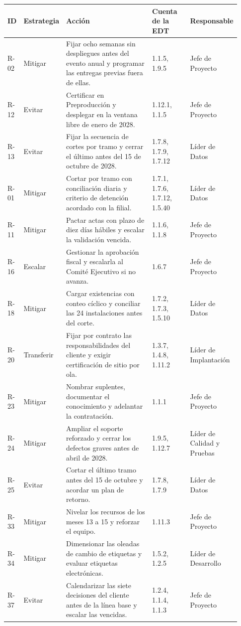 \documentclass[11pt]{article}
\begin{document}
\begin{longtable}{p{0.069\linewidth}p{0.109\linewidth}p{0.406\linewidth}p{0.178\linewidth}p{0.168\linewidth}}
\toprule
\textbf{ID} & \textbf{Estrategia} & \textbf{Acción} & \textbf{Cuenta de la EDT} & \textbf{Responsable} \\
\midrule
\endhead
\bottomrule
\endlastfoot
R-02 & Mitigar & Fijar ocho semanas sin despliegues antes del evento anual y programar las entregas previas fuera de ellas. & 1.1.5, 1.9.5 & Jefe de Proyecto \\
R-12 & Evitar & Certificar en Preproducción y desplegar en la ventana libre de enero de 2028. & 1.12.1, 1.1.5 & Jefe de Proyecto \\
R-13 & Evitar & Fijar la secuencia de cortes por tramo y cerrar el último antes del 15 de octubre de 2028. & 1.7.8, 1.7.9, 1.7.12 & Líder de Datos \\
R-01 & Mitigar & Cortar por tramo con conciliación diaria y criterio de detención acordado con la filial. & 1.7.1, 1.7.6, 1.7.12, 1.5.40 & Líder de Datos \\
R-11 & Mitigar & Pactar actas con plazo de diez días hábiles y escalar la validación vencida. & 1.1.6, 1.1.8 & Jefe de Proyecto \\
R-16 & Escalar & Gestionar la aprobación fiscal y escalarla al Comité Ejecutivo si no avanza. & 1.6.7 & Jefe de Proyecto \\
R-18 & Mitigar & Cargar existencias con conteo cíclico y conciliar las 24 instalaciones antes del corte. & 1.7.2, 1.7.3, 1.5.10 & Líder de Datos \\
R-20 & Transferir & Fijar por contrato las responsabilidades del cliente y exigir certificación de sitio por ola. & 1.3.7, 1.4.8, 1.11.2 & Líder de Implantación \\
R-23 & Mitigar & Nombrar suplentes, documentar el conocimiento y adelantar la contratación. & 1.1.1 & Jefe de Proyecto \\
R-24 & Mitigar & Ampliar el soporte reforzado y cerrar los defectos graves antes de abril de 2028. & 1.9.5, 1.12.7 & Líder de Calidad y Pruebas \\
R-25 & Evitar & Cortar el último tramo antes del 15 de octubre y acordar un plan de retorno. & 1.7.8, 1.7.9 & Líder de Datos \\
R-33 & Mitigar & Nivelar los recursos de los meses 13 a 15 y reforzar el equipo. & 1.11.3 & Jefe de Proyecto \\
R-34 & Mitigar & Dimensionar las oleadas de cambio de etiquetas y evaluar etiquetas electrónicas. & 1.5.2, 1.2.5 & Líder de Desarrollo \\
R-37 & Evitar & Calendarizar las siete decisiones del cliente antes de la línea base y escalar las vencidas. & 1.2.4, 1.1.4, 1.1.3 & Jefe de Proyecto \\
\end{longtable}
\end{document}
